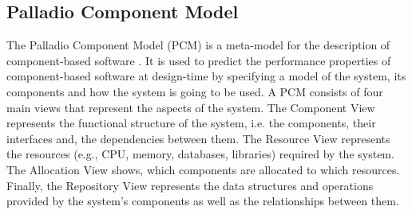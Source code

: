 \subsection{Palladio Component Model}
\label{sec:Foundation:PCM}
The Palladio Component Model (PCM) is a meta-model for the description of component-based software \cite{Becker2008}.
It is used to predict the performance properties of component-based software at design-time by specifying a model of the system, its components and how the system is going to be used.
A PCM consists of four main views that represent the aspects of the system.
The Component View represents the functional structure of the system, i.e. the components, their interfaces and, the dependencies between them.
The Resource View represents the resources (e.g., CPU, memory, databases, libraries) required by the system.
The Allocation View shows, which components are allocated to which resources.
Finally, the Repository View represents the data structures and operations provided by the system's components as well as the relationships between them. \cite{Becker2008}
